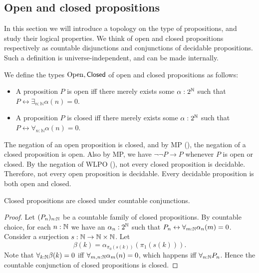 %
\subsection{Open and closed propositions}
In this section we will introduce a topology on the type of propositions, and 
study their logical properties.
We think of open and closed propositions respectively as countable disjunctions and conjunctions of decidable propositions.
Such a definition is universe-independent, and can be made internally.

\begin{definition}
  We define the types $\mathrm{Open}, \mathsf{Closed}$ of open and closed propositions as follows:
  \begin{itemize}
    \item 
    A proposition $P$ is open iff there merely exists some $\alpha:2^{\mathbb{N}}$ such that 
      $P \leftrightarrow \exists_{n:\mathbb N} \alpha(n) = 0$. 
    \item 
    A proposition $P$ is closed iff there merely exists some $\alpha:2^{\mathbb{N}}$ such that 
      $P \leftrightarrow \forall_{n:\mathbb N} \alpha(n) = 0$. 
  \end{itemize}
\end{definition}

\begin{remark}\label{rmkOpenClosedNegation}
  The negation of an open proposition is closed, 
  and by MP (), the negation of a closed proposition is open. 
  Also by MP, we have $\neg \neg P \to P$ whenever $P$ is open or closed. 
  By the negation of WLPO (), 
  not every closed proposition is decidable. 
  Therefore, not every open proposition is decidable. 
  Every decidable proposition is both open and closed.
\end{remark}

\begin{lemma}\label{ClosedCountableConjunction}
  Closed propositions are closed under countable conjunctions.
\end{lemma}
\begin{proof}
  Let $(P_n)_{n:\mathbb{N}}$ be a countable family of closed propositions. 
  By countable choice, for each 
  $n:\mathbb{N}$ we have an $\alpha_n:2^{\mathbb{N}} $ 
  such that $P_n \leftrightarrow \forall_{m:\mathbb{N}} \alpha_n(m)  =0$. 
  Consider a surjection $s:\mathbb{N} \to \mathbb{N} \times \mathbb{N}$.
  Let 
  $$\beta(k) = \alpha_{\pi_0(s(k))}(\pi_1 (s(k))).$$
  Note that $\forall_{k:\mathbb{N}} \beta(k) = 0$ iff 
  $\forall_{m,n:\mathbb{N}}\alpha_m(n) = 0$, which happens iff $\forall_{n:\mathbb{N}} P_n$. 
  Hence the countable conjunction of closed propositions is closed. 
\end{proof} 

